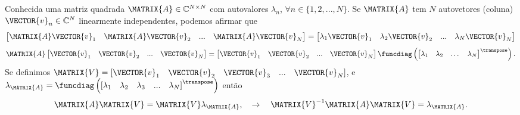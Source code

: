 \begin{myproofT}\label{proof:theo:diagonalization1:a}
Conhecida uma matriz quadrada $\MATRIX{A} \in \mathbb{C}^{N \times N}$ com
autovalores $\lambda_n$, $\forall n \in \{1, 2, ..., N\}$.
Se $\MATRIX{A}$ tem $N$  autovetores (coluna) $\VECTOR{v}_n \in \mathbb{C}^{N}$  linearmente independentes,
podemos afirmar que
\begin{equation}
\begin{bmatrix}
\MATRIX{A} \VECTOR{v}_1 & \MATRIX{A} \VECTOR{v}_2 & ... & \MATRIX{A} \VECTOR{v}_N
\end{bmatrix}=
\begin{bmatrix}
\lambda_1 \VECTOR{v}_1 & \lambda_2 \VECTOR{v}_2 & ... & \lambda_N \VECTOR{v}_N
\end{bmatrix}
\end{equation}
\begin{equation}
\MATRIX{A}
\begin{bmatrix}
 \VECTOR{v}_1 &  \VECTOR{v}_2 & ... &  \VECTOR{v}_N
\end{bmatrix}=
\begin{bmatrix}
 \VECTOR{v}_1 & \VECTOR{v}_2 & ... &  \VECTOR{v}_N
\end{bmatrix}
\funcdiag\left(
\begin{bmatrix}
\lambda_1 & \lambda_2 & \dots & \lambda_N
\end{bmatrix}^{\transpose}\right).
\end{equation}
Se definimos $\MATRIX{V}=\left[\VECTOR{v}_1\quad \VECTOR{v}_2\quad \VECTOR{v}_3\quad ...\quad \VECTOR{v}_N\right]$,
e $\lambda_{\MATRIX{A}}=\funcdiag\left(\left[\lambda_1\quad \lambda_2\quad \lambda_3\quad ...\quad \lambda_N\right]^{\transpose}\right)$
então
\begin{equation}
\MATRIX{A} \MATRIX{V} = \MATRIX{V} \lambda_{\MATRIX{A}},
\quad \rightarrow \quad
\MATRIX{V}^{-1} \MATRIX{A} \MATRIX{V} =  \lambda_{\MATRIX{A}}.
\end{equation}
\end{myproofT}
